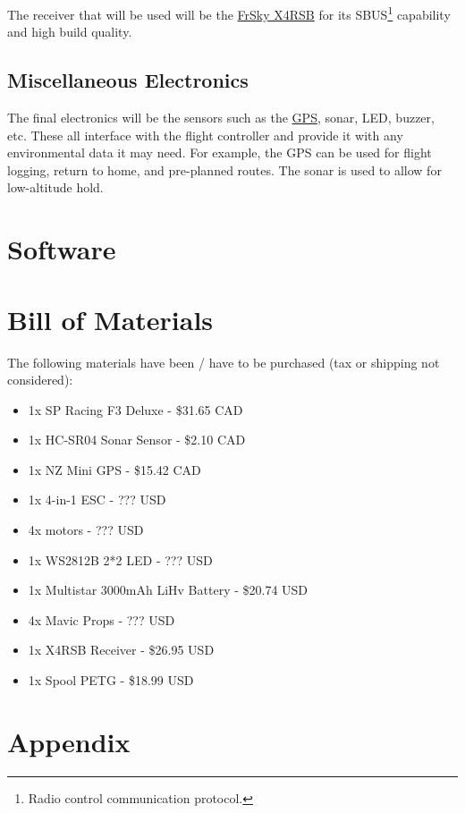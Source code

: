 \documentclass[12pt]{article}
\begin{document}
The receiver that will be used will be the \href{https://hobbyking.com/en_us/frsky-x4rsb-3-16ch-2-4ghz-accst-receiver-w-telemetry.html}{\color{cyan}FrSky X4RSB} for its SBUS\footnote{Radio control communication protocol.} capability and high build quality. 

\subsection{Miscellaneous Electronics}
The final electronics will be the sensors such as the \href{https://www.banggood.com/NZ-GPS-For-NAZE32-Flip32-6dof-10dof-Best-For-QAV250-ZMR250-Multicopter-Quadcopter-p-1015134.html}{\color{cyan}GPS}, sonar, LED, buzzer, etc. These all interface with the flight controller and provide it with any environmental data it may need. For example, the GPS can be used for flight logging, return to home, and pre-planned routes. The sonar is used to allow for low-altitude hold. 

\section{Software}

\section{Bill of Materials}
The following materials have been / have to be purchased (tax or shipping not considered): 
\renewcommand{\labelitemi}{\textperiodcentered}
\begin{itemize}
\item{1x SP Racing F3 Deluxe - \$31.65 CAD}
\item{1x HC-SR04 Sonar Sensor - \$2.10 CAD}
\item{1x NZ Mini GPS - \$15.42 CAD}
\item{1x 4-in-1 ESC - ??? USD}
\item{4x motors - ??? USD}
\item{1x WS2812B 2*2 LED - ??? USD}
\item{1x Multistar 3000mAh LiHv Battery - \$20.74 USD}
\item{4x Mavic Props - ??? USD}
\item{1x X4RSB Receiver - \$26.95 USD}
\item{1x Spool PETG - \$18.99 USD}
\end{itemize}

\section{Appendix}
\end{document}
